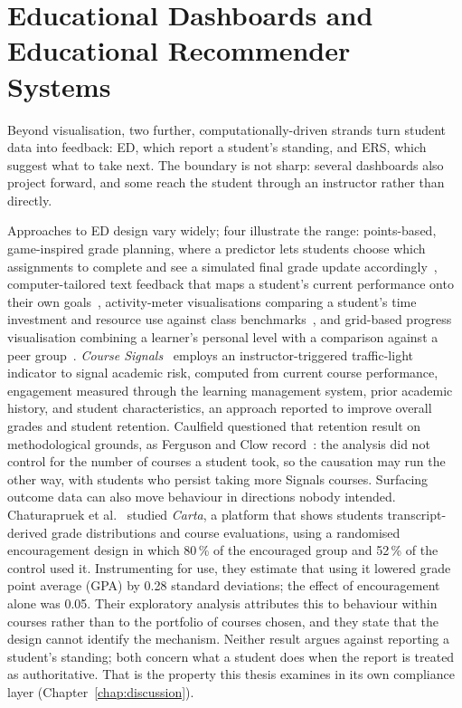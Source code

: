 \section{Educational Dashboards and Educational Recommender Systems}
\label{sec:related-analytics}

Beyond visualisation, two further, computationally-driven strands turn student data into feedback: ED, which report a student's standing, and ERS, which suggest what to take next. The boundary is not sharp: several dashboards also project forward, and some reach the student through an instructor rather than directly.

Approaches to ED design vary widely; four illustrate the range: points-based, game-inspired grade planning, where a predictor lets students choose which assignments to complete and see a simulated final grade update accordingly~\cite{holman_gradecraft_2013}, computer-tailored text feedback that maps a student's current performance onto their own goals~\cite{huberth_computer-tailored_2015}, activity-meter visualisations comparing a student's time investment and resource use against class benchmarks~\cite{govaerts_student_2012}, and grid-based progress visualisation combining a learner's personal level with a comparison against a peer group~\cite{loboda_mastery_2014}.
\emph{Course Signals}~\cite{arnold_course_2012} employs an instructor-triggered traffic-light indicator to signal academic risk, computed from current course performance, engagement measured through the learning management system, prior academic history, and student characteristics, an approach reported to improve overall grades and student retention. Caulfield questioned that retention result on methodological grounds, as Ferguson and Clow record~\cite{ferguson_evidence_2017}: the analysis did not control for the number of courses a student took, so the causation may run the other way, with students who persist taking more Signals courses. Surfacing outcome data can also move behaviour in directions nobody intended. Chaturapruek et al.~\cite{chaturapruek_how_2018} studied \emph{Carta}, a platform that shows students transcript-derived grade distributions and course evaluations, using a randomised encouragement design in which 80\,\% of the encouraged group and 52\,\% of the control used it. Instrumenting for use, they estimate that using it lowered grade point average (GPA) by 0.28 standard deviations; the effect of encouragement alone was 0.05. Their exploratory analysis attributes this to behaviour within courses rather than to the portfolio of courses chosen, and they state that the design cannot identify the mechanism. Neither result argues against reporting a student's standing; both concern what a student does when the report is treated as authoritative. That is the property this thesis examines in its own compliance layer (Chapter~\ref{chap:discussion}).

